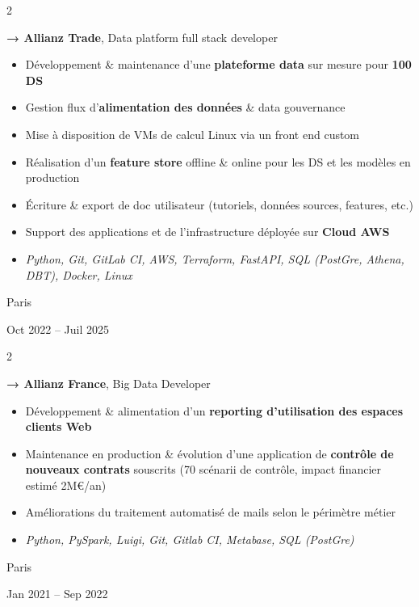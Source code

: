 \documentclass[10pt, letterpaper]{article}
\newenvironment{highlights}{
    \begin{itemize}[
        topsep=0.10 cm,
        parsep=0.10 cm,
        partopsep=0pt,
        itemsep=0pt,
        leftmargin=0.4 cm + 10pt
    ]
}{
    \end{itemize}
} %
\newenvironment{twocolentry}[2][]{
    \onecolentry
    \def\secondColumn{#2}
    \setcolumnwidth{\fill, 3.5 cm}
    \begin{paracol}{2}
}{
    \switchcolumn \raggedleft \secondColumn
    \end{paracol}
    \endonecolentry
} %
\begin{document}
        \begin{twocolentry}{
            Paris

        Oct 2022 – Juil 2025
        }
            \textbf{→ Allianz Trade}, Data platform full stack developer
            \begin{highlights}
                \item Développement \& maintenance d'une \textbf{plateforme data} sur mesure pour \textbf{100 DS}
                \item Gestion flux d'\textbf{alimentation des données} \& data gouvernance
                \item Mise à disposition de VMs de calcul Linux via un front end custom
                \item Réalisation d'un \textbf{feature store} offline \& online pour les DS et les modèles en production
                \item Écriture \& export de doc utilisateur (tutoriels, données sources, features, etc.)
                \item Support des applications et de l'infrastructure déployée sur \textbf{Cloud AWS}
                \item \textit{Python, Git, GitLab CI, AWS, Terraform, FastAPI, SQL (PostGre, Athena, DBT), Docker, Linux}
            \end{highlights}
        \end{twocolentry}


        \vspace{0.2 cm}

        \begin{twocolentry}{
            Paris

        Jan 2021 – Sep 2022
        }
            \textbf{→ Allianz France}, Big Data Developer
            \begin{highlights}
                \item Développement \& alimentation d'un \textbf{reporting d'utilisation des espaces clients Web}
                \item Maintenance en production \& évolution d'une application de \textbf{contrôle de nouveaux contrats} souscrits (70 scénarii de contrôle, impact financier estimé 2M€/an)
                \item Améliorations du traitement automatisé de mails selon le périmètre métier
                \item \textit{Python, PySpark, Luigi, Git, Gitlab CI, Metabase, SQL (PostGre)}
            \end{highlights}
        \end{twocolentry}
\end{document}
